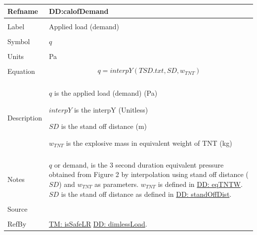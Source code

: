 \documentclass[12pt]{article}
\begin{document}
\noindent \begin{minipage}{\textwidth}
\begin{tabular}{p{} p{}}
\toprule \textbf{Refname} & \textbf{DD:calofDemand}
\label{DD:calofDemand}
\\ \midrule \\
Label & Applied load (demand)
        \\ \midrule \\
        Symbol & $q$
                 \\ \midrule \\
                 Units & Pa
                         \\ \midrule \\
                         Equation & \begin{displaymath}
                                    q=interpY\left(TSD.txt,SD,{w_{TNT}}\right)
                                    \end{displaymath}
                                    \\ \midrule \\
                                    Description & \begin{symbDescription}
                                                  \item{$q$ is the applied load (demand) (Pa)}
                                                  \item{$interpY$ is the interpY (Unitless)}
                                                  \item{$SD$ is the stand off distance (m)}
                                                  \item{${w_{TNT}}$ is the explosive mass in equivalent weight of TNT (kg)}
                                                  \end{symbDescription}
                                                  \\ \midrule \\
                                                  Notes & $q$ or demand, is the 3 second duration equivalent pressure obtained from Figure 2 by interpolation using stand off distance ($SD$) and ${w_{TNT}}$ as parameters. ${w_{TNT}}$ is defined in \hyperref[DD:eqTNTW]{DD: eqTNTW}. $SD$ is the stand off distance as defined in \hyperref[DD:standOffDist]{DD: standOffDist}.
                                                          \\ \midrule \\
                                                          Source & \cite{astm2009}
                                                                   \\ \midrule \\
                                                                   RefBy & \hyperref[TM:isSafeLR]{TM: isSafeLR} \hyperref[DD:dimlessLoad]{DD: dimlessLoad}.
\\ \bottomrule \end{tabular}
\end{minipage}
\end{document}
